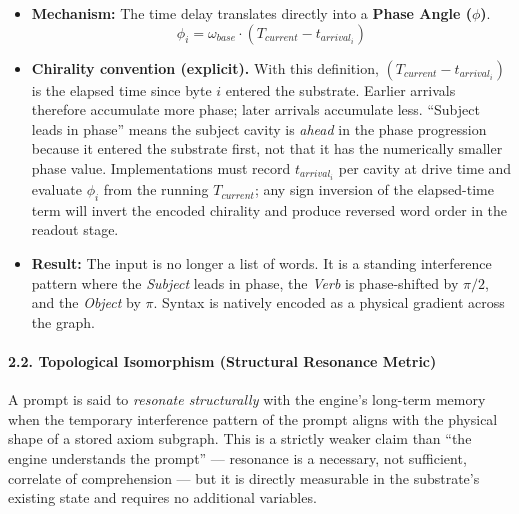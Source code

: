\documentclass[
  11pt,
  a4paper,
]{article}
\providecommand{\tightlist}{%
  \setlength{\itemsep}{0pt}\setlength{\parskip}{0pt}}
\begin{document}
\begin{itemize}
\tightlist
\item
  \textbf{Mechanism:} The time delay translates directly into a
  \textbf{Phase Angle (\(\phi\))}.
  \[ \phi_i = \omega_{base} \cdot (T_{current} - t_{arrival_i}) \]
\item
  \textbf{Chirality convention (explicit).} With this definition,
  \((T_{current} - t_{arrival_i})\) is the elapsed time since byte \(i\)
  entered the substrate. Earlier arrivals therefore accumulate more
  phase; later arrivals accumulate less. ``Subject leads in phase''
  means the subject cavity is \emph{ahead} in the phase progression
  because it entered the substrate first, not that it has the
  numerically smaller phase value. Implementations must record
  \(t_{arrival_i}\) per cavity at drive time and evaluate \(\phi_i\)
  from the running \(T_{current}\); any sign inversion of the
  elapsed-time term will invert the encoded chirality and produce
  reversed word order in the readout stage.
\item
  \textbf{Result:} The input is no longer a list of words. It is a
  standing interference pattern where the \emph{Subject} leads in phase,
  the \emph{Verb} is phase-shifted by \(\pi/2\), and the \emph{Object}
  by \(\pi\). Syntax is natively encoded as a physical gradient across
  the graph.
\end{itemize}

\paragraph{2.2. Topological Isomorphism (Structural Resonance
Metric)}\label{topological-isomorphism-structural-resonance-metric}

A prompt is said to \emph{resonate structurally} with the engine's
long-term memory when the temporary interference pattern of the prompt
aligns with the physical shape of a stored axiom subgraph. This is a
strictly weaker claim than ``the engine understands the prompt'' ---
resonance is a necessary, not sufficient, correlate of comprehension ---
but it is directly measurable in the substrate's existing state and
requires no additional variables.
\end{document}
